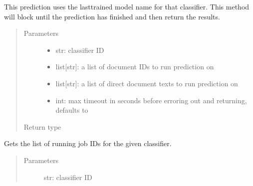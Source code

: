 \documentclass[letterpaper,10pt,english]{sphinxmanual}
\begin{document}
\begin{fulllineitems}
\begin{fulllineitems}
\sphinxAtStartPar
This prediction uses the last\sphinxhyphen{}trained model name for that classifier.  This method will
block until the prediction has finished and then return the results.
\begin{quote}\begin{description}
\item[{Parameters}] \leavevmode\begin{itemize}
\item {} 
\sphinxAtStartPar
{} \textendash{} str: classifier ID

\item {} 
\sphinxAtStartPar
{} \textendash{} list{[}str{]}: a list of document IDs to run prediction on

\item {} 
\sphinxAtStartPar
{} \textendash{} list{[}str{]}: a list of direct document texts to run prediction on

\item {} 
\sphinxAtStartPar
{} \textendash{} int: max timeout in seconds before erroring out and returning, defaults
to 

\end{itemize}

\item[{Return type}] \leavevmode
\sphinxAtStartPar
{}

\end{description}\end{quote}

\end{fulllineitems}


\begin{fulllineitems}
\label{\detokenize{autoapi/pine/client/client/index:pine.client.client.PineClient.get_classifier_running_jobs}}
\sphinxAtStartPar
Gets the list of running job IDs for the given classifier.
\begin{quote}\begin{description}
\item[{Parameters}] \leavevmode
\sphinxAtStartPar
{} \textendash{} str: classifier ID


\end{description}
\end{quote}
\end{fulllineitems}
\end{fulllineitems}
\end{document}
